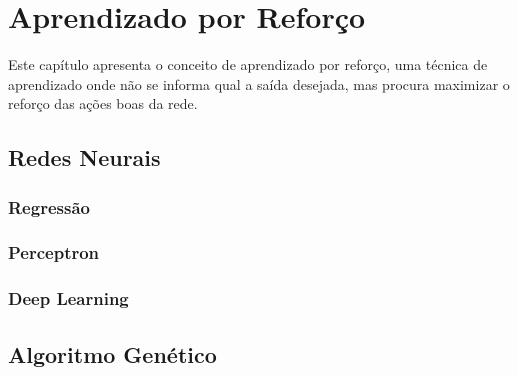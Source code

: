 \chapter{Aprendizado por Reforço}
\label{chap:reinf}

 Este capítulo apresenta o conceito de aprendizado por reforço, uma técnica de aprendizado onde não se informa qual a saída desejada, mas procura maximizar o reforço das ações boas da rede.
 
\section{Redes Neurais}
\label{sec:neural}


\subsection{Regressão}
\label{subsec:regression}


\subsection{Perceptron}
\label{subsec:perceptron}


\subsection{Deep Learning}
\label{subsec:deep}


\section{Algoritmo Genético}
\label{sec:genetic}




